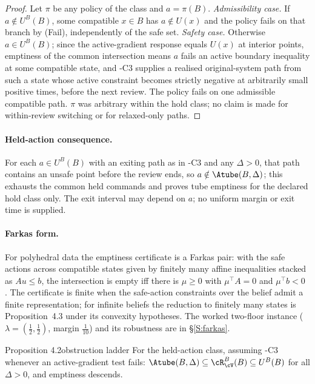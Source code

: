 \begin{proof}
Let $\pi$ be any policy of the class and $a=\pi(B)$. \emph{Admissibility case.} If $a\notin U^B(B)$, some compatible $x\in B$ has $a\notin U(x)$ and the policy fails on that branch by (Fail), independently of the safe set. \emph{Safety case.} Otherwise $a\in U^B(B)$; since the active-gradient response equals $U(x)$ at interior points, emptiness of the common intersection means $a$ fails an active boundary inequality at some compatible state, and \hyp{C3} supplies a realised original-system path from such a state whose active constraint becomes strictly negative at arbitrarily small positive times, before the next review. The policy fails on one admissible compatible path. $\pi$ was arbitrary within the hold class; no claim is made for within-review switching or for relaxed-only paths.
\end{proof}

\paragraph{Held-action consequence.} For each $a\in U^B(B)$ with an exiting path as in \hyp{C3} and any $\Delta>0$, that path contains an unsafe point before the review ends, so $a\notin\Atube(B,\Delta)$; this exhausts the common held commands and proves tube emptiness for the declared hold class only. The exit interval may depend on $a$; no uniform margin or exit time is supplied.

\paragraph{Farkas form.} For polyhedral data the emptiness certificate is a Farkas pair: with the safe actions across compatible states given by finitely many affine inequalities stacked as $Au\le b$, the intersection is empty iff there is $\mu\ge0$ with $\mu^\top A=0$ and $\mu^\top b<0$ \citep{farkas1902,gale1960}. The certificate is finite when the safe-action constraints over the belief admit a finite representation; for infinite beliefs the reduction to finitely many states is Proposition~4.3 under its convexity hypotheses. The worked two-floor instance ($\lambda=(\tfrac12,\tfrac12)$, margin $\tfrac1{10}$) and its robustness are in \S\ref{S:farkas}.

\begin{restated}{Proposition 4.2}{obstruction ladder}
For the held-action class, assuming \hyp{C3} whenever an active-gradient test fails: $\Atube(B,\Delta)\subseteq\cR^B_\cV(B)\subseteq U^B(B)$ for all $\Delta>0$, and emptiness descends.
\end{restated}

